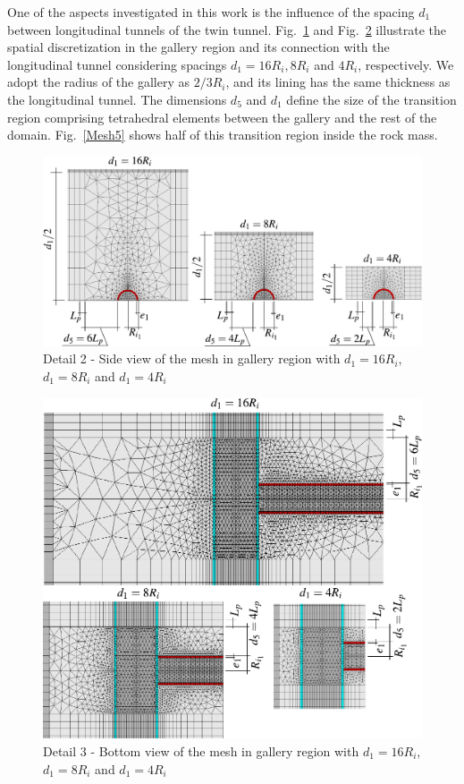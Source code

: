 \documentclass[a4paper,fleqn]{cas-sc}
\begin{document}
\FloatBarrier
One of the aspects investigated in this work is the influence of the spacing $d_1$ between longitudinal tunnels of the twin tunnel. Fig.~\ref{Mesh3} and Fig.~\ref{Mesh4} illustrate the spatial discretization in the gallery region and its connection with the longitudinal tunnel considering spacings $d_1 = 16R_i, 8R_i$ and $4R_i$, respectively. We adopt the radius of the gallery as $2/3R_i$, and its lining has the same thickness as the longitudinal tunnel. The dimensions $d_5$ and $d_1$ define the size of the transition region comprising tetrahedral elements between the gallery and the rest of the domain. Fig.~\ref{Mesh5} shows half of this transition region inside the rock mass.
\begin{figure}[h!]
	\centering
	\includegraphics[scale=0.8]{Mesh3.pdf}
	\caption{Detail 2 - Side view of the mesh in gallery region with $d_1=16R_i$, $d_1=8R_i$ and $d_1=4R_i$}
	\label{Mesh3}
\end{figure}
\begin{figure}[h!]
	\centering
	\includegraphics[scale=0.6]{Mesh4.pdf}
	\caption{Detail 3 - Bottom view  of the mesh in gallery region with $d_1=16R_i$, $d_1=8R_i$ and $d_1=4R_i$}
	\label{Mesh4}
\end{figure}
\end{document}
